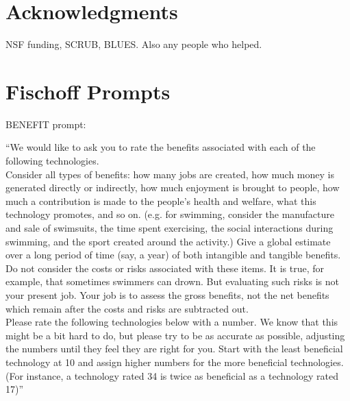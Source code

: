 \documentclass{acm_proc_article-sp}
\begin{document}

\section{Acknowledgments}
NSF funding, SCRUB, BLUES. Also any people who helped.







\appendix
\section{Fischoff Prompts}
\label{sec:prompt}

BENEFIT prompt: 


``We would like to ask you to rate the benefits associated with each of the following technologies.  \\[-.6cm]

Consider all types of benefits: how many jobs are created, how much money is generated directly or indirectly, how much enjoyment is brought to people, how much a contribution is made to the people's health and welfare, what this technology promotes, and so on. (e.g. for swimming, consider the manufacture and sale of swimsuits, the time spent exercising, the social interactions during swimming, and the sport created around the activity.) Give a global estimate over a long period of time (say, a year) of both intangible and tangible benefits. \\[-.6cm]

Do not consider the costs or risks associated with these items. It is true, for example, that sometimes swimmers can drown. But evaluating such risks is not your present job. Your job is to assess the gross benefits, not the net benefits which remain after the costs and risks are subtracted out. \\[-.6cm]

Please rate the following technologies below with a number. We know that this might be a bit hard to do, but please try to be as accurate as possible, adjusting the numbers until they feel they are right for you. Start with the least beneficial technology at 10 and assign higher numbers for the more beneficial technologies. (For instance, a technology rated 34 is twice as beneficial as a technology rated 17)''
\end{document}
